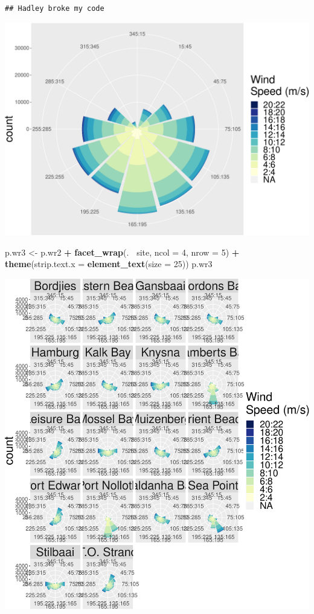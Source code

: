 \documentclass[10pt,A4,]{article}
\makeatletter
\newenvironment{Shaded}{\begin{snugshade}}{\end{snugshade}}
\newcommand{\KeywordTok}[1]{\textcolor[rgb]{0.13,0.29,0.53}{\textbf{#1}}}
\newcommand{\DataTypeTok}[1]{\textcolor[rgb]{0.13,0.29,0.53}{#1}}
\newcommand{\DecValTok}[1]{\textcolor[rgb]{0.00,0.00,0.81}{#1}}
\newcommand{\StringTok}[1]{\textcolor[rgb]{0.31,0.60,0.02}{#1}}
\newcommand{\OperatorTok}[1]{\textcolor[rgb]{0.81,0.36,0.00}{\textbf{#1}}}
\newcommand{\NormalTok}[1]{#1}
\def\maxwidth{\ifdim\Gin@nat@width>\linewidth\linewidth
\else\Gin@nat@width\fi}
\let\Oldincludegraphics\includegraphics
\renewcommand{\includegraphics}[1]{\Oldincludegraphics[width=\maxwidth]{#1}}
\makeatother
\begin{document}
\begin{verbatim}
## Hadley broke my code
\end{verbatim}

\includegraphics{appendices_files/figure-latex/Windrose diagram -1.pdf}

\begin{Shaded}
\begin{Highlighting}[]
\NormalTok{p.wr3 <-}\StringTok{ }\NormalTok{p.wr2 }\OperatorTok{+}\StringTok{ }\KeywordTok{facet_wrap}\NormalTok{(.}\OperatorTok{~}\StringTok{ }\NormalTok{site, }\DataTypeTok{ncol =} \DecValTok{4}\NormalTok{, }\DataTypeTok{nrow =} \DecValTok{5}\NormalTok{) }\OperatorTok{+}
\StringTok{  }\KeywordTok{theme}\NormalTok{(}\DataTypeTok{strip.text.x =} \KeywordTok{element_text}\NormalTok{(}\DataTypeTok{size =} \DecValTok{25}\NormalTok{))}
\NormalTok{p.wr3}
\end{Highlighting}
\end{Shaded}

\includegraphics{appendices_files/figure-latex/Windrose diagram -2.pdf}
\end{document}
